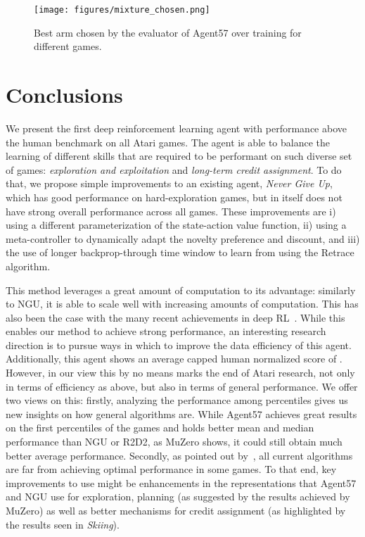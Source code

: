 \documentclass{article}
\begin{document}
\begin{figure}[!t]
    \centering
    \texttt{[image: figures/mixture\_chosen.png]}
    \caption{Best arm chosen by the evaluator of Agent57 over training for different games.}
    \label{fig:mixture_chosen}
    \vspace{-3ex}
\end{figure}

\section{Conclusions}
\label{subsec:conclusions}

We present the first deep reinforcement learning agent with performance above the human benchmark on all  Atari games. The agent is able to balance the learning of different skills that are required to be performant on such diverse set of games: \textit{exploration and exploitation} and \textit{long-term credit assignment}. To do that, we propose simple improvements to an existing agent, \textit{Never Give Up}, which has good performance on hard-exploration games, but in itself does not have strong overall performance across all  games. These improvements are i) using a different parameterization of the state-action value function, ii) using a meta-controller to dynamically adapt the novelty preference and discount, and iii) the use of longer backprop-through time window to learn from using the Retrace algorithm.

This method leverages a great amount of computation to its advantage: similarly to NGU, it is able to scale well with increasing amounts of computation. This has also been the case with the many recent achievements in deep RL~\citep{silver2016mastering, andrychowicz2018learning, vinyals2019grandmaster}. While this enables our method to achieve strong performance, an interesting research direction is to pursue ways in which to improve the data efficiency of this agent. Additionally, this agent shows an average capped human normalized score of . However, in our view this by no means marks the end of Atari research, not only in terms of efficiency as above, but also in terms of general performance. We offer two views on this: firstly, analyzing the performance among percentiles gives us new insights on how general algorithms are. While Agent57 achieves great results on the first percentiles of the  games and holds better mean and median performance than NGU or R2D2, as MuZero shows, it could still obtain much better average performance. Secondly, as pointed out by~\citet{toromanoff2019deep}, all current algorithms are far from achieving optimal performance in some games. To that end, key improvements to use might be enhancements in the representations that Agent57 and NGU use for exploration, planning (as suggested by the results achieved by MuZero) as well as better mechanisms for credit assignment (as highlighted by the results seen in \textit{Skiing}).
\end{document}
